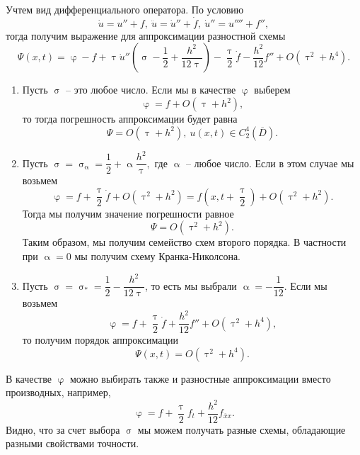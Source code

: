 \documentclass[a4paper, 12pt]{report}
\numberwithin{equation}{section}
\newcommand{\ol}{\overline}
\renewcommand{\alpha}{\upalpha}
\renewcommand{\varphi}{\upvarphi}
\renewcommand{\tau}{\uptau}
\renewcommand{\sigma}{\upsigma}
\begin{document}
	Учтем вид дифференциального оператора. По условию
	$$\dot u = u'' + f,\ \ddot u = \dot u '' + \dot f,\ \dot u '' = u'''' + f'',$$
	тогда получим выражение для аппроксимации разностной схемы
	$$\Psi(x,t) = \varphi - f + \tau \dot u''\left(\sigma - \dfrac 12 + \dfrac {h^2}{12\tau}\right) - \dfrac \tau 2 \dot f - \dfrac{h^2}{12}f'' + O(\tau^2 + h^4).$$
	\begin{enumerate}
		\item Пусть $\sigma$ -- это любое число. Если мы в качестве $\varphi$ выберем
		$$\varphi = f + O(\tau + h^2),$$ то тогда погрешность аппроксимации будет равна
		$$\Psi = O(\tau + h^2),\ u(x,t) \in C_2^4 (\ol D).$$
		\item Пусть $\sigma = \sigma_\alpha = \dfrac 12 + \alpha \dfrac{h^2}{\tau},$ где $\alpha$ -- любое число. Если в этом случае мы возьмем
		$$\varphi = f + \dfrac \tau 2 \dot f + O(\tau^2 + h^2) = f\left(x,t + \dfrac \tau 2\right) + O(\tau^2 + h^2).$$ Тогда мы получим значение погрешности равное
		$$\Psi = O(\tau^2 + h^2).$$
		Таким образом, мы получим семейство схем второго порядка. В частности при $\alpha = 0$ мы получим схему Кранка-Николсона.
		\item Пусть $\sigma = \sigma_* = \dfrac 12 - \dfrac {h^2}{12\tau}$, то есть мы выбрали $\alpha = - \dfrac {1}{12}$. Если мы возьмем
		$$\varphi = f + \dfrac \tau 2 \dot f + \dfrac{h^2}{12}f'' + O(\tau^2 + h^4),$$
		то получим порядок аппроксимации
		$$\Psi(x,t) = O(\tau^2 + h^4).$$
	\end{enumerate}
	В качестве $\varphi$ можно  выбирать также и разностные аппроксимации вместо производных, например,
	$$\varphi = f+\dfrac \tau 2 f_t + \dfrac{h^2}{12}f_{\ol x x}.$$
	Видно, что за счет выбора $\sigma$ мы можем получать разные схемы, обладающие разными свойствами точности.
\end{document}
